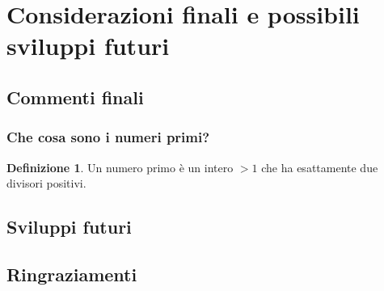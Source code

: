 \documentclass{beamer}
\theoremstyle{definition}
\newtheorem{definizione}{Definizione}
\theoremstyle{plain}
\begin{document}
\section{Considerazioni finali e possibili sviluppi futuri}
\subsection{Commenti finali}
\begin{frame}
\frametitle{Che cosa sono i numeri primi?}
\begin{definizione}
Un \alert{numero primo} è un intero $>1$ che ha esattamente
due divisori positivi.
\end{definizione}
\end{frame}
\subsection{Sviluppi futuri}
\subsection{Ringraziamenti}

%
%
\end{document}
